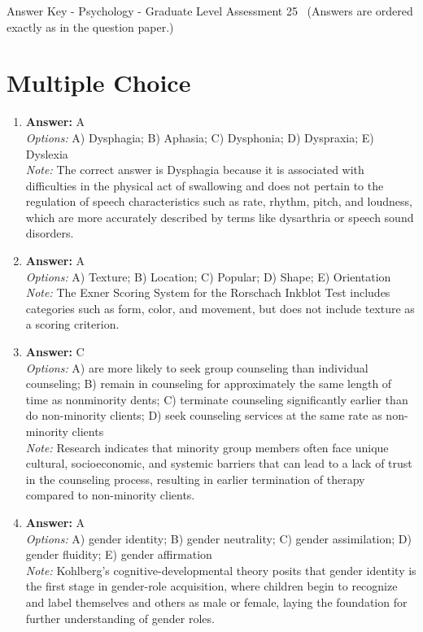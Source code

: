 \documentclass[12pt]{article}
\begin{document}
\begin{center}
Answer Key - Psychology - Graduate Level Assessment 25 \
\small (Answers are ordered exactly as in the question paper.)
\end{center}

\section*{Multiple Choice}
\begin{enumerate}[label=\arabic*.]
\item \textbf{Answer:} A
\\ \textit{Options:} A) Dysphagia; B) Aphasia; C) Dysphonia; D) Dyspraxia; E) Dyslexia
\\ \textit{Note:} The correct answer is Dysphagia because it is associated with difficulties in the physical act of swallowing and does not pertain to the regulation of speech characteristics such as rate, rhythm, pitch, and loudness, which are more accurately described by terms like dysarthria or speech sound disorders.
\item \textbf{Answer:} A
\\ \textit{Options:} A) Texture; B) Location; C) Popular; D) Shape; E) Orientation
\\ \textit{Note:} The Exner Scoring System for the Rorschach Inkblot Test includes categories such as form, color, and movement, but does not include texture as a scoring criterion.
\item \textbf{Answer:} C
\\ \textit{Options:} A) are more likely to seek group counseling than individual counseling; B) remain in counseling for approximately the same length of time as nonminority dents; C) terminate counseling significantly earlier than do non-minority clients; D) seek counseling services at the same rate as non-minority clients
\\ \textit{Note:} Research indicates that minority group members often face unique cultural, socioeconomic, and systemic barriers that can lead to a lack of trust in the counseling process, resulting in earlier termination of therapy compared to non-minority clients.
\item \textbf{Answer:} A
\\ \textit{Options:} A) gender identity; B) gender neutrality; C) gender assimilation; D) gender fluidity; E) gender affirmation
\\ \textit{Note:} Kohlberg's cognitive-developmental theory posits that gender identity is the first stage in gender-role acquisition, where children begin to recognize and label themselves and others as male or female, laying the foundation for further understanding of gender roles.

\end{enumerate}
\end{document}
